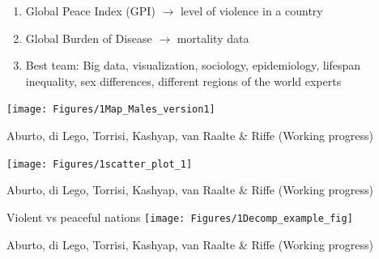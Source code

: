 \documentclass[xcolor={dvipsnames}]{beamer}
\begin{document}
\begin{frame}
	\LARGE{ 
		
		\begin{enumerate}
		
		\item Global Peace Index (GPI) $\longrightarrow$ level of violence in a country \pause

		\item Global Burden of Disease $\longrightarrow$ mortality data \pause
		
		\item Best team: Big data, visualization, sociology, epidemiology, lifespan inequality, sex differences, different regions of the world experts
						
		\end{enumerate}
		
		}
\end{frame}



\begin{frame}

\hspace*{-1cm}   
	\texttt{[image: Figures/1Map\_Males\_version1]}	

\bigskip
	
\tiny{Aburto, di Lego, Torrisi, Kashyap, van Raalte \& Riffe (Working progress)}

\end{frame}


\begin{frame}

\begin{center} 
\hspace*{-1cm}   
	\texttt{[image: Figures/1scatter\_plot\_1]}	
\end{center}

\bigskip
	
\tiny{Aburto, di Lego, Torrisi, Kashyap, van Raalte \& Riffe (Working progress)}

\end{frame}


\begin{frame}

Violent vs peaceful nations
\hspace*{-.5cm}   
	\texttt{[image: Figures/1Decomp\_example\_fig]}	

\bigskip
	
\tiny{Aburto, di Lego, Torrisi, Kashyap, van Raalte \& Riffe (Working progress)}

\end{frame}
\end{document}
